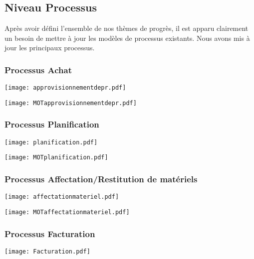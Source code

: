         \subsection{Niveau Processus}
        Après avoir défini l'ensemble de nos thèmes de progrès, il est apparu clairement un besoin de mettre à jour les modèles de processus existants. Nous avons mis à jour les principaux processus.\\

                \subsubsection{Processus Achat}
                    \texttt{[image: approvisionnementdepr.pdf]}

                    \texttt{[image: MOTapprovisionnementdepr.pdf]}

                \subsubsection{Processus Planification}
                    \texttt{[image: planification.pdf]}
                    
                    \texttt{[image: MOTplanification.pdf]}
                
                \subsubsection{Processus Affectation/Restitution de matériels}
                    \texttt{[image: affectationmateriel.pdf]}

                    \texttt{[image: MOTaffectationmateriel.pdf]}

                \subsubsection{Processus Facturation}
                    \texttt{[image: Facturation.pdf]}


